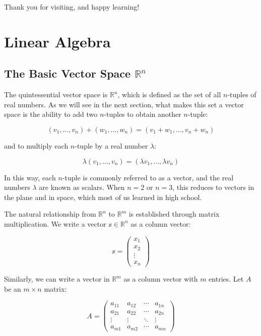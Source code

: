 \documentclass[
]{book}
\theoremstyle{definition}
\theoremstyle{definition}
\theoremstyle{definition}
\theoremstyle{definition}
\theoremstyle{remark}
\begin{document}
Thank you for visiting, and happy learning!

\hypertarget{linear-algebra}{%
\chapter{Linear Algebra}\label{linear-algebra}}

\hypertarget{the-basic-vector-space-mathbbrn}{%
\section{\texorpdfstring{The Basic Vector Space \(\mathbb{R}^n\)}{The Basic Vector Space \textbackslash mathbb\{R\}\^{}n}}\label{the-basic-vector-space-mathbbrn}}

The quintessential vector space is \(\mathbb{R}^n\), which is defined as the set of all \(n\)-tuples of real numbers. As we will see in the next section, what makes this set a vector space is the ability to add two \(n\)-tuples to obtain another \(n\)-tuple:

\[
(v_1, \ldots, v_n) + (w_1, \ldots, w_n) = (v_1 + w_1, \ldots, v_n + w_n)
\]

and to multiply each \(n\)-tuple by a real number \(\lambda\):

\[
\lambda (v_1, \ldots, v_n) = (\lambda v_1, \ldots, \lambda v_n)
\]

In this way, each \(n\)-tuple is commonly referred to as a vector, and the real numbers \(\lambda\) are known as scalars. When \(n = 2\) or \(n = 3\), this reduces to vectors in the plane and in space, which most of us learned in high school.

The natural relationship from \(\mathbb{R}^n\) to \(\mathbb{R}^m\) is established through matrix multiplication. We write a vector \(\mathbb{x} \in \mathbb{R}^n\) as a column vector:

\[
\mathbb{x} = \begin{pmatrix} x_1 \\ x_2 \\ \vdots \\ x_n \end{pmatrix}
\]

Similarly, we can write a vector in \(\mathbb{R}^m\) as a column vector with \(m\) entries. Let \(A\) be an \(m \times n\) matrix:

\[
A = \begin{pmatrix}
a_{11} & a_{12} & \cdots & a_{1n} \\
a_{21} & a_{22} & \cdots & a_{2n} \\
\vdots & \vdots & \ddots & \vdots \\
a_{m1} & a_{m2} & \cdots & a_{mn}
\end{pmatrix}
\]
\end{document}
